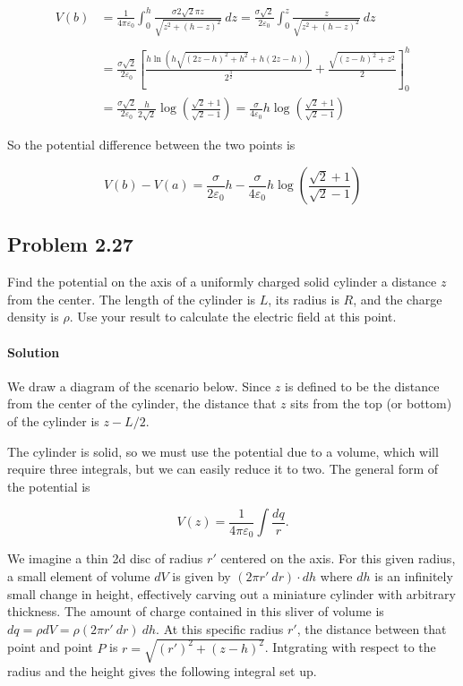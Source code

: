 \documentclass{article}
\begin{document}
\begin{align*}
    V(b) &= \frac{1}{4\pi \varepsilon_0} \int_0^h \frac{\sigma 2\sqrt{2}\pi z}{\sqrt{z^2 + (h - z)^2}}\ dz = \frac{\sigma \sqrt{2}}{2\varepsilon_0} \int_0^z \frac{z}{\sqrt{z^2 + (h - z)^2}}\ dz \\
    \\
    &= \frac{\sigma \sqrt{2}}{2\varepsilon_0}\left[\frac{h \ln\left(h \sqrt{\left(2z - h\right)^{2} + h^{2}} + h \left(2z - h\right)\right)}{2^{\frac{3}{2}}} + \frac{\sqrt{\left(z - h\right)^{2} + z^{2}}}{2}\right]^h_0 \\
    &= \frac{\sigma \sqrt{2}}{2\varepsilon_0}\frac{h}{2\sqrt{2}} \log \left( \frac{\sqrt{2} + 1}{\sqrt{2} - 1} \right) = \frac{\sigma}{4\varepsilon_0}h \log \left( \frac{\sqrt{2} + 1}{\sqrt{2} - 1} \right)
\end{align*}

So the potential difference between the two points is 

$$
V(b) - V(a) = \frac{\sigma}{2\varepsilon_0}h - \frac{\sigma}{4\varepsilon_0}h \log \left( \frac{\sqrt{2} + 1}{\sqrt{2} - 1} \right)
$$

\newpage

\subsection*{Problem 2.27}
Find the potential on the axis of a uniformly charged solid cylinder a distance $z$ from the center. The length of the cylinder is $L$, its radius is $R$, and the charge density is $\rho$. Use your result to calculate the electric field at this point.

\paragraph{Solution} We draw a diagram of the scenario below. Since $z$ is defined to be the distance from the center of the cylinder, the distance that $z$ sits from the top (or bottom) of the cylinder is $z - L/2$.



The cylinder is solid, so we must use the potential due to a volume, which will require three integrals, but we can easily reduce it to two.  The general form of the potential is

$$
V(z) = \frac{1}{4\pi \varepsilon_0} \int \frac{dq}{r}.
$$

We imagine a thin 2d disc of radius $r'$ centered on the axis. For this given radius, a small element of volume $dV$ is given by $(2\pi r'\ dr)\cdot dh$ where $dh$ is an infinitely small change in height, effectively carving out a miniature cylinder with arbitrary thickness. The amount of charge contained in this sliver of volume is $dq = \rho dV = \rho (2\pi r'\ dr)\ dh$. At this specific radius $r'$, the distance between that point and point $P$ is $r = \sqrt{(r')^2 + (z - h)^2}$.  Intgrating with respect to the radius and the height gives the following integral set up. 
\end{document}
